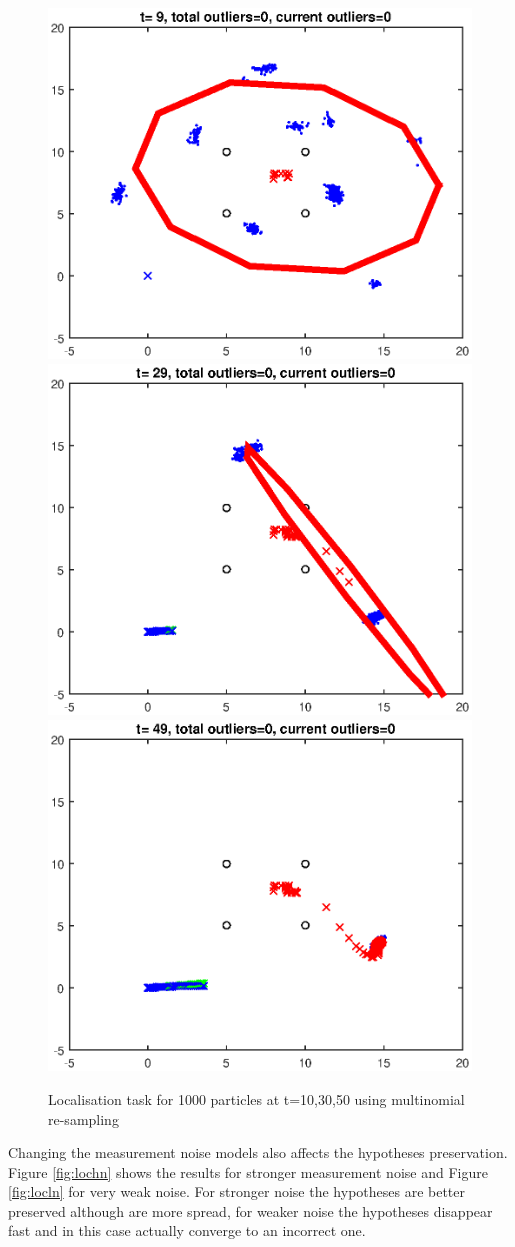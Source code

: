 \documentclass[12pt]{article}
\begin{document}
\begin{figure}[htp]

\centering
\includegraphics[width=.3\textwidth]{sym2loc1000_t10_multi}\hfill
\includegraphics[width=.3\textwidth]{sym2loc1000_t30_multi}\hfill
\includegraphics[width=.3\textwidth]{sym2loc1000_t50_multi}

\caption{Localisation task for 1000 particles at t=10,30,50 using multinomial re-sampling}
\label{fig:locmulti}

\end{figure}

Changing the measurement noise models also affects the hypotheses preservation. Figure \ref{fig:lochn} shows the results for stronger measurement noise and Figure \ref{fig:locln} for very weak noise. For stronger noise the hypotheses are better preserved although are more spread, for weaker noise the hypotheses disappear fast and in this case actually converge to an incorrect one.
\end{document}
